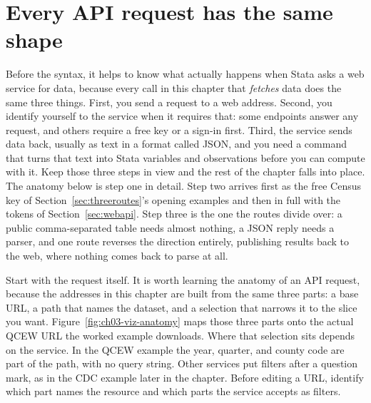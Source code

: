 \documentclass[
    a4paper,
    fontsize=10pt,
    twoside=true,
    numbers=noenddot,
]{kaobook}
\begin{document}
\section{Every API request has the same shape}\label{ch03-sc-shape}
Before the syntax, it helps to know what actually happens when Stata asks a web service for data, because every call in this chapter that \emph{fetches} data does the same three things. First, you send a request to a web address. Second, you identify yourself to the service when it requires that: some endpoints answer any request, and others require a free key or a sign-in first. Third, the service sends data back, usually as text in a format called JSON, and you need a command that turns that text into Stata variables and observations before you can compute with it. Keep those three steps in view and the rest of the chapter falls into place. The anatomy below is step one in detail. Step two arrives first as the free Census key of Section~\ref{sec:threeroutes}'s opening examples and then in full with the tokens of Section~\ref{sec:webapi}. Step three is the one the routes divide over: a public comma-separated table needs almost nothing, a JSON reply needs a parser, and one route reverses the direction entirely, publishing results back to the web, where nothing comes back to parse at all.

Start with the request itself. It is worth learning the anatomy of an API request, because the addresses in this chapter are built from the same three parts: a base URL, a path that names the dataset, and a selection that narrows it to the slice you want. Figure~\ref{fig:ch03-viz-anatomy} maps those three parts onto the actual QCEW URL the worked example downloads. Where that selection sits depends on the service. In the QCEW example the year, quarter, and county code are part of the path, with no query string. Other services put filters after a question mark, as in the CDC example later in the chapter. Before editing a URL, identify which part names the resource and which parts the service accepts as filters.
\end{document}
